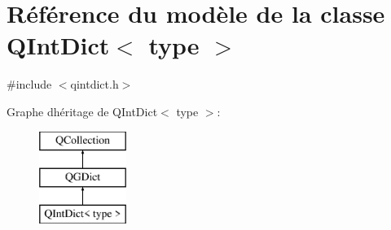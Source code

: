 \hypertarget{class_q_int_dict}{}\section{Référence du modèle de la classe Q\+Int\+Dict$<$ type $>$}
\label{class_q_int_dict}


{\ttfamily \#include $<$qintdict.\+h$>$}

Graphe d\textquotesingle{}héritage de Q\+Int\+Dict$<$ type $>$\+:\begin{figure}[H]
\begin{center}
\leavevmode
\includegraphics[height=3.000000cm]{class_q_int_dict}
\end{center}
\end{figure}
